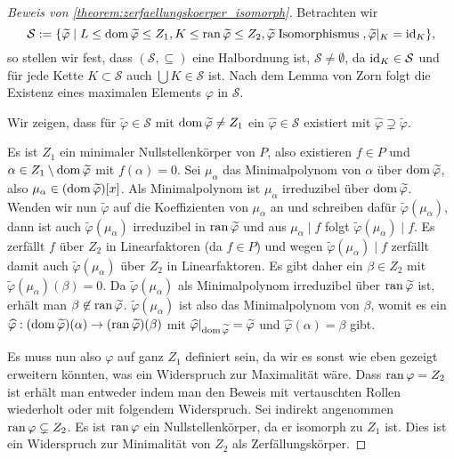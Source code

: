 \begin{proof}[Beweis von \cref{theorem:zerfaellungskoerper_isomorph}]
    Betrachten wir $$\mathcal{S} := \{\widetilde{\varphi} \mid L\le \operatorname{dom} \widetilde\varphi \le Z_1, K\le \operatorname{ran} \widetilde\varphi \le Z_2, \widetilde\varphi\;\text{Isomorphismus}\;, \widetilde\varphi\vert_K = \operatorname{id}_K \},$$
    so stellen wir fest, dass $(\mathcal{S}, \subseteq)$ eine Halbordnung ist, $\mathcal{S} \neq \emptyset$, da $\operatorname{id}_K \in \mathcal{S}$ und für jede Kette $K \subset \mathcal{S}$ auch $\bigcup K \in \mathcal{S}$ ist. Nach dem Lemma von Zorn folgt die Existenz eines maximalen Elements $\varphi$ in $\mathcal{S}$.

    Wir zeigen, dass für $\widetilde\varphi \in \mathcal{S}$ mit $\operatorname{dom} \widetilde\varphi \neq Z_1$ ein $\widehat\varphi \in \mathcal{S}$ existiert mit $\widehat\varphi \supsetneq \widetilde\varphi$.
    
    Es ist $Z_1$ ein minimaler Nullstellenkörper von $P$, also existieren $f \in P$ und $\alpha \in Z_1\setminus\operatorname{dom} \widetilde{\varphi}$ mit $f(\alpha) = 0$. Sei $\mu_\alpha$ das Minimalpolynom von $\alpha$ über $\operatorname{dom} \widetilde\varphi$, also $\mu_\alpha \in (\operatorname{dom} \widetilde\varphi)[x]$. Als Minimalpolynom ist $\mu_\alpha$ irreduzibel über $\operatorname{dom} \widetilde\varphi$. Wenden wir nun $\widetilde\varphi$ auf die Koeffizienten von $\mu_\alpha$ an und schreiben dafür $\widetilde\varphi(\mu_\alpha)$, dann ist auch $\widetilde\varphi(\mu_\alpha)$ irreduzibel in $\operatorname{ran} \widetilde\varphi$ und aus $\mu_\alpha \mid f$ folgt $\widetilde\varphi(\mu_\alpha) \mid f$. 
    Es zerfällt $f$ über $Z_2$ in Linearfaktoren (da $f \in P$) und wegen $\widetilde\varphi(\mu_\alpha) \mid f$ zerfällt damit auch $\widetilde\varphi(\mu_\alpha)$ über $Z_2$ in Linearfaktoren. Es gibt daher ein $\beta \in Z_2$ mit $\widetilde\varphi(\mu_\alpha)(\beta) = 0$. Da $\widetilde\varphi(\mu_\alpha)$ als Minimalpolynom irreduzibel über $\operatorname{ran} \widetilde\varphi$ ist, erhält man $\beta \not\in \operatorname{ran} \widetilde\varphi$.  $\widetilde\varphi(\mu_\alpha)$ ist also das Minimalpolynom von $\beta$, womit es ein $\widehat\varphi: (\operatorname{dom} \widetilde\varphi)(\alpha) \to (\operatorname{ran} \widetilde\varphi)(\beta)$ mit $\widehat\varphi\vert_{\operatorname{dom} \widetilde\varphi} = \widetilde\varphi$ und $\widehat\varphi(\alpha) = \beta$ gibt.

    Es muss nun also $\varphi$ auf ganz $Z_1$ definiert sein, da wir es sonst wie eben gezeigt erweitern könnten, was ein Widerspruch zur Maximalität wäre. Dass $\operatorname{ran} \varphi = Z_2$ ist erhält man entweder indem man den Beweis mit vertauschten Rollen wiederholt oder mit folgendem Widerspruch. Sei indirekt angenommen $\operatorname{ran} \varphi \subsetneq Z_2$. Es ist $\operatorname{ran} \varphi$ ein Nullstellenkörper, da er isomorph zu $Z_1$ ist. Dies ist ein Widerspruch zur Minimalität von $Z_2$ als Zerfällungskörper.
\end{proof}

